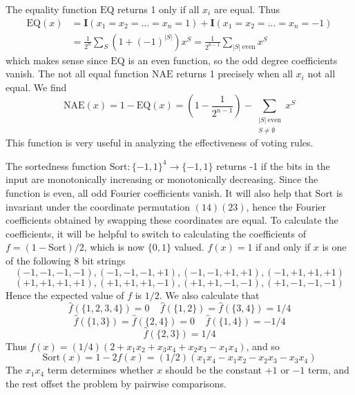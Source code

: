 \begin{example}
    The equality function $\text{EQ}$ returns 1 only if all $x_i$ are equal. Thus
    \begin{align*}
        \text{EQ}(x) &= \mathbf{I}(x_1 = x_2 = \dots = x_n = 1) + \mathbf{I}(x_1 = x_2 = \dots = x_n = -1)\\
        &= \frac{1}{2^n} \sum_S (1 + (-1)^{|S|}) x^S = \frac{1}{2^{n-1}} \sum_{|S|\ \text{even}} x^S
    \end{align*}
    which makes sense since $\text{EQ}$ is an even function, so the odd degree coefficients vanish. The not all equal function $\text{NAE}$ returns 1 precisely when all $x_i$ not all equal. We find
    \[ \text{NAE}(x) = 1 - \text{EQ}(x) = \left( 1 - \frac{1}{2^{n-1}} \right) - \sum_{\substack{|S|\ \text{even}\\S \neq \emptyset}} x^S \]
    This function is very useful in analyzing the effectiveness of voting rules.
\end{example}

\begin{example}
    The sortedness function $\text{Sort} : \{ -1, 1 \}^4 \to \{ -1, 1 \}$ returns -1 if the bits in the input are monotonically increasing or monotonically decreasing. Since the function is even, all odd Fourier coefficients vanish. It will also help that $\text{Sort}$ is invariant under the coordinate permutation $(1 4)(2 3)$, hence the Fourier coefficients obtained by swapping these coordinates are equal. To calculate the coefficients, it will be helpful to switch to calculating the coefficients of $f = (1 - \text{Sort})/2$, which is now $\{ 0, 1 \}$ valued. $f(x) = 1$ if and only if $x$ is one of the following 8 bit strings
    \[ (-1,-1,-1,-1), (-1,-1,-1,+1), (-1,-1,+1,+1), (-1,+1,+1,+1) \]
    \[ (+1,+1,+1,+1), (+1,+1,+1,-1), (+1,+1,-1,-1), (+1,-1,-1,-1) \]
    Hence the expected value of $f$ is $1/2$. We also calculate that
    \[ \widehat{f}(\{1,2,3,4\}) = 0\ \ \ \ \ \widehat{f}(\{1,2\}) = \widehat{f}(\{3,4\}) = 1/4 \]
    \[ \widehat{f}(\{ 1, 3 \}) = \widehat{f}(\{2,4\}) = 0\ \ \ \ \ \widehat{f}(\{1,4\}) = -1/4 \]
    \[ \widehat{f}(\{2,3\}) = 1/4 \]
    Thus $f(x) = (1/4)(2 + x_1x_2 + x_3x_4 + x_2x_3 - x_1x_4)$, and so
    \[ \text{Sort}(x) = 1 - 2f(x) = (1/2)(x_1x_4 - x_1x_2 - x_2x_3 - x_3x_4) \]
    The $x_1x_4$ term determines whether $x$ should be the constant $+1$ or $-1$ term, and the rest offset the problem by pairwise comparisons.
\end{example}

